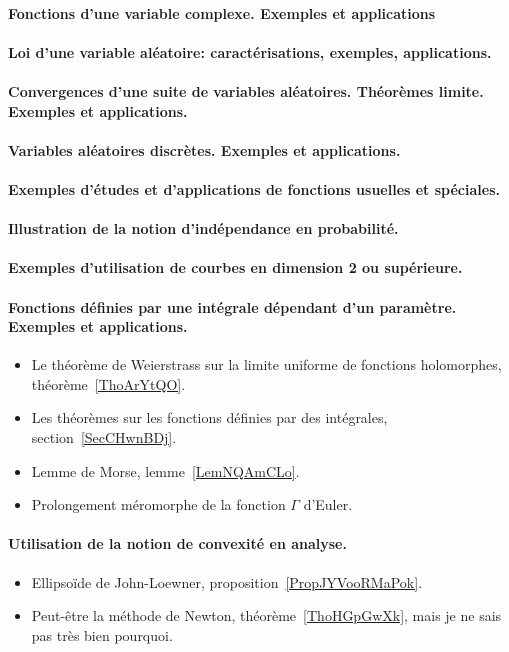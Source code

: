 \paragraph{Fonctions d'une variable complexe. Exemples et applications}
\paragraph{Loi d'une variable aléatoire: caractérisations, exemples, applications.}
\paragraph{Convergences d'une suite de variables aléatoires. Théorèmes limite. Exemples et applications.}
\paragraph{Variables aléatoires discrètes. Exemples et applications.}
\paragraph{Exemples d'études et d'applications de fonctions usuelles et spéciales.}
\paragraph{Illustration de la notion d'indépendance en probabilité.}
\paragraph{Exemples d'utilisation de courbes en dimension 2 ou supérieure.}


\paragraph{Fonctions définies par une intégrale dépendant d’un paramètre. Exemples et applications.}
\begin{itemize}
	\item Le théorème de Weierstrass sur la limite uniforme de fonctions holomorphes, théorème~\ref{ThoArYtQO}.
	\item Les théorèmes sur les fonctions définies par des intégrales, section~\ref{SecCHwnBDj}.
	\item Lemme de Morse, lemme~\ref{LemNQAmCLo}.
	\item Prolongement méromorphe de la fonction \( \Gamma\) d'Euler.
\end{itemize}
\paragraph{Utilisation de la notion de convexité en analyse.}
\begin{itemize}
	\item Ellipsoïde de John-Loewner, proposition~\ref{PropJYVooRMaPok}.
	\item Peut-être la méthode de Newton, théorème~\ref{ThoHGpGwXk}, mais je ne sais pas très bien pourquoi.
\end{itemize}

